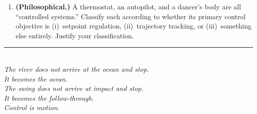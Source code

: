 \documentclass[12pt, openany]{book}
\theoremstyle{plain}
\begin{document}
\begin{enumerate}[label=\textbf{1.\arabic*.}, leftmargin=1.5cm]
\item \textbf{(Philosophical.)} A thermostat, an autopilot, and a dancer's body
  are all ``controlled systems.'' Classify each according to whether its primary
  control objective is (i)~setpoint regulation, (ii)~trajectory tracking, or
  (iii)~something else entirely. Justify your classification.

\end{enumerate}

\vspace{1cm}
\begin{center}
  \rule{0.5\textwidth}{0.4pt}\\[0.5cm]
  {\small\itshape
  The river does not arrive at the ocean and stop.\\
  It becomes the ocean.\\
  The swing does not arrive at impact and stop.\\
  It becomes the follow-through.\\[0.3cm]
  Control is motion.}
\end{center}
\end{document}

